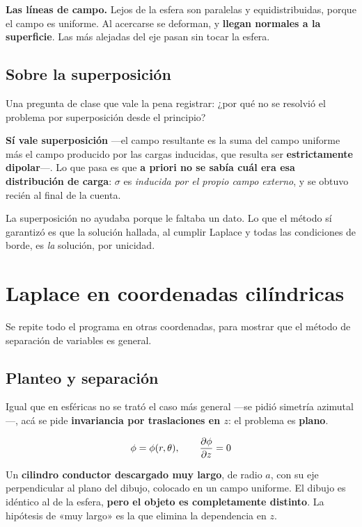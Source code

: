 \documentclass[12pt,a4paper]{article}
\begin{document}
\textbf{Las líneas de campo.} Lejos de la esfera son paralelas y equidistribuidas,
porque el campo es uniforme. Al acercarse se deforman, y \textbf{llegan normales a
la superficie}. Las más alejadas del eje pasan sin tocar la esfera.

\subsection{Sobre la superposición}

Una pregunta de clase que vale la pena registrar: ¿por qué no se resolvió el
problema por superposición desde el principio?

\textbf{Sí vale superposición} ---el campo resultante es la suma del campo uniforme
más el campo producido por las cargas inducidas, que resulta ser
\textbf{estrictamente dipolar}---. Lo que pasa es que \textbf{a priori no se sabía
cuál era esa distribución de carga}: $\sigma$ es \emph{inducida por el propio
campo externo}, y se obtuvo recién al final de la cuenta.

\begin{keybox}
La superposición no ayudaba porque le faltaba un dato. Lo que el método sí
garantizó es que la solución hallada, al cumplir Laplace y todas las condiciones
de borde, es \emph{la} solución, por unicidad.
\end{keybox}

\section{Laplace en coordenadas cilíndricas}

Se repite todo el programa en otras coordenadas, para mostrar que el método de
separación de variables es general.

\subsection{Planteo y separación}

Igual que en esféricas no se trató el caso más general ---se pidió simetría
azimutal---, acá se pide \textbf{invariancia por traslaciones en $z$}: el problema
es \textbf{plano}.

\[
\phi = \phi(r,\theta), \qquad \pdv{\phi}{z} = 0
\]

\begin{notebox}[El ejemplo]
Un \textbf{cilindro conductor descargado muy largo}, de radio $a$, con su eje
perpendicular al plano del dibujo, colocado en un campo uniforme. El dibujo es
idéntico al de la esfera, \textbf{pero el objeto es completamente distinto}. La
hipótesis de «muy largo» es la que elimina la dependencia en $z$.
\end{notebox}
\end{document}
